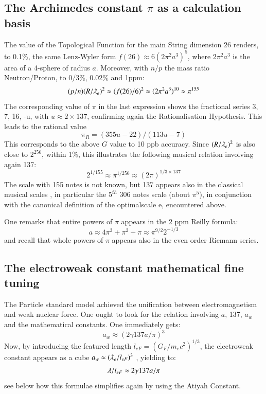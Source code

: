 \documentclass[twoside,draft]{article}
\begin{document}
\begin{sloppypar}
{\subsection {The Archimedes constant $\pi$ as a calculation basis}

The value of the Topological Function for the main String
 dimension 26 renders, to 0.1\%, the same Lenz-Wyler form $f(26) \approx 6(2\pi^{2} a^{3} )^{5}$, where $2\pi^{2}a^{3}$ is the area of a 4-sphere of radius $a$. Moreover, with $n/p$ the mass ratio Neutron/Proton, to 0/3\%, 0.02\% and 1ppm:
$$(p/n) (R/\lambdabar_{e})^{2} \approx (f(26)/6)^{2} \approx (2\pi^{2} a^{3})^{10} \approx \pi^{155}$$
The corresponding value of $\pi$ in the last expression shows the fractional series 3, 7, 16, -u, with $u \approx
2 \times 137$, confirming again the Rationalisation Hypothesis. This leads to the rational value
\begin{equation}
\pi_{R} = (355u-22)/(113u-7) 
\end{equation}
This corresponds to the above $G$ value to 10 ppb accuracy.
Since $(R/\lambdabar_{e})^{2}$ is also close to $2^{256}$, within 1\%, this illustrates the following musical relation involving again 137:
$$2^{1/155} \approx \pi^{1/256} \approx (2\pi)^{1/3 \times 137}$$
The scale with 155 notes is not known, but 137 appears also in the classical musical scales \cite{Sanchez1}, in
particular the $5^{th}$ 306 notes scale (about $\pi^{5}$), in conjunction with the canonical definition of the optimalscale e, encountered above.

One remarks that entire powers of $\pi$ appears in the 2 ppm Reilly formula: 
\begin{equation}
a \approx 4\pi^{3} + \pi^{2} + \pi \approx \pi^{9/2}2^{-1/3}
\end{equation}
and recall that whole powers of $\pi$ appears also in the even order Riemann series.

\subsection {The electroweak constant mathematical fine tuning}

The Particle standard model achieved the unification between electromagnetism and weak
nuclear force. One ought to look for the relation involving $a$, 137, $a_{w}$ and the mathematical constants. One
immediately gets:
\begin{equation}
a_{w} \approx (2\gamma 137 a/\pi)^{3}
\end{equation}
Now, by introducing the featured length $l_{eF} = (G_{F}/m_{e} c^{2})^{1/3}$, the electroweak constant appears as
a cube $a_{w} \approx (\lambdabar_{e}/l_{eF})^{3}$ , yielding to:
\begin{equation}
\lambdabar/l_{eF} \approx 2\gamma 137 a/\pi
\end{equation}
see below how this formulae simplifies again by using the Atiyah Constant.

}
\end{sloppypar}
\end{document}
